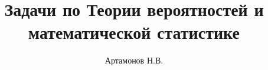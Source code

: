 \documentclass[12pt]{article}
\title{Задачи по Теории вероятностей и математической статистике}
\author{Артамонов Н.В.}
\theoremstyle{remark}
\begin{document}
\maketitle

\markright{}\tableofcontents




\end{document}
